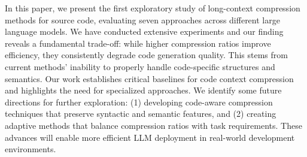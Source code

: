 In this paper, we present the first exploratory study of long-context compression methods for source code, evaluating seven approaches across different large language models. We have conducted extensive experiments and our finding reveals a fundamental trade-off: while higher compression ratios improve efficiency, they consistently degrade code generation quality. This stems from current methods' inability to properly handle code-specific structures and semantics. Our work establishes critical baselines for code context compression and highlights the need for specialized approaches. We identify some future directions for further exploration: (1) developing code-aware compression techniques that preserve syntactic and semantic features, and (2) creating adaptive methods that balance compression ratios with task requirements. These advances will enable more efficient LLM deployment in real-world development environments.




